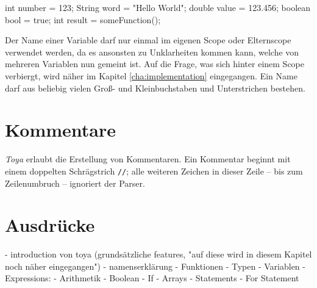 \begin{JavaCode}[numbers=none,caption={Variablendeklaration in Java (vor Version 10)}]
int number = 123;
String word = "Hello World";
double value = 123.456;
boolean bool = true;
int result = someFunction();
\end{JavaCode}

Der Name einer Variable darf nur einmal im eigenen Scope oder Elternscope verwendet werden, da es ansonsten zu Unklarheiten kommen kann, welche von mehreren Variablen nun gemeint ist. Auf die Frage, was sich hinter einem Scope verbiergt, wird näher im Kapitel \ref{cha:implementation} eingegangen. Ein Name darf aus beliebig vielen Groß- und Kleinbuchstaben und Unterstrichen bestehen. 

\section{Kommentare}

\textit{Toya} erlaubt die Erstellung von Kommentaren. Ein Kommentar beginnt mit einem doppelten Schrägstrich \texttt{//}; alle weiteren Zeichen in dieser Zeile -- bis zum Zeilenumbruch -- ignoriert der Parser.


\section{Ausdrücke}

- introduction von toya (grundsätzliche features, "auf diese wird in diesem Kapitel noch näher eingegangen")
- namenserklärung
- Funktionen
- Typen
- Variablen
- Expressions:
    - Arithmetik
    - Boolean
    - If
    - Arrays
- Statements
    - For Statement